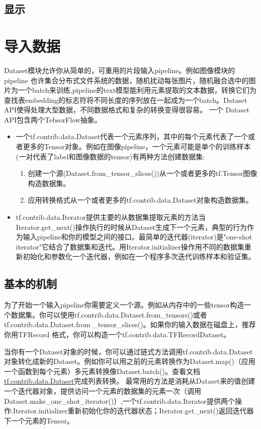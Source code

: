 \subsection{显示}




\section{导入数据}
Dataset模块允许你从简单的，可重用的片段输入pipeline。例如图像模块的pipeline
也许集合分布式文件系统的数据，随机扰动每张图片，随机融合选中的图片为一个batch来训练,pipeline的text模型能利用元素提取的文本数据，转换它们为查找表embedding的标志符将不同长度的序列放在一起成为一个batch。Dataset API使得处理大型数据，不同数据格式和复杂的转换变得很容易。
一个 Dataset
 API包含两个TebsorFlow抽象。
\begin{itemize}
\item 一个tf.contrib.data.Dataset代表一个元素序列，其中的每个元素代表了一个或者更多的Tensor对象。例如在图像pipeline，一个元素可能是单个的训练样本(一对代表了label和图像数据的tensor)有两种方法创建数据集:
	\begin{enumerate}
		\item 创建一个源(Dataset.from\_tensor\_slices())从一个或者更多的tf.Tensor图像构造数据集。
		\item 应用转换格式从一个或者更多的tf.contrib.data.Dataset对象构造数据集。
	\end{enumerate}
	\item tf.contrib.data.Iterator提供主要的从数据集提取元素的方法当Iterator.get\_next()操作执行的时候从Dataset生成下一个元素，典型的行为作为输入pipeline和你的模型之间的接口。最简单的迭代器(iterator)是"one-shot iterator"它结合了数据集和迭代。用Iterator.initializer操作用不同的数据集重新初始化和参数化一个迭代器，例如在一个程序多次迭代训练样本和验证集。
\end{itemize}
\subsection{基本的机制}
为了开始一个输入pipeline你需要定义一个源。例如从内存中的一些tensor构造一个数据集。你可以使用tf.contrib.data.Dataset.from\_tensors()或者tf.contrib.data.Dataset.from
\newline \_tensor\_slices()。如果你的输入数据在磁盘上，推荐你用TFRecord
格式，你可以构造一个tf.contrib.data.TFRecordDataset。

当你有一个Dataset对象的时候，你可以通过链式方法调用tf.contrib.data.Dataset对象转化成新的Dataset。例如你可以用之前的元素转换作为Dataset.map()（应用一个函数到每个元素）多元素转换像Dataset.batch()。查看文档\href{https://www.tensorflow.org/api_docs/python/tf/contrib/data/Dataset}{tf.contrib.data.Dataset}完成列表转换。
最常用的方法是消耗从Dataset来的值创建一个迭代器对象，提供访问一个元素的数据集的元素一次（调用Dataset.make\_one\_shot\_iterator()）,一个tf.contrib.data.Iterator提供两个操作:Iterator.initializer重新初始化你的迭代器状态；Iterator.get\_next()返回迭代器下一个元素的Tensor。
